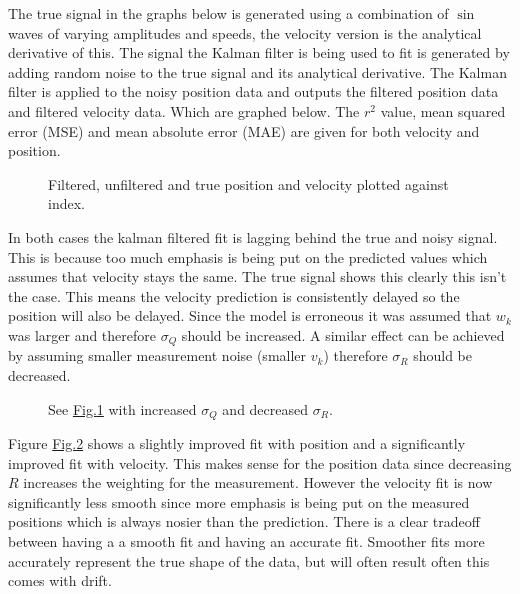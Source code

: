 \documentclass[letterpaper,10pt,english]{jupyterBook}
\begin{document}
\sphinxAtStartPar
The true signal in the graphs below is generated using a combination of \(\sin\) waves of varying amplitudes and speeds, the velocity version is the analytical derivative of this. The signal the Kalman filter is being used to fit is generated by adding random noise to the true signal and its analytical derivative. The Kalman filter is applied to the noisy position data and outputs the filtered position data and filtered velocity data. Which are graphed below.
The \(r^2\) value, mean squared error (MSE) and mean absolute error (MAE) are given for both velocity and position.

\begin{figure}[htbp]
\centering
\capstart

\noindent{}
\caption{Filtered, unfiltered and true position and velocity plotted against index.}\label{\detokenize{4ExampleVelocityFromPosition:fig-original}}\end{figure}

\sphinxAtStartPar
In both cases the kalman filtered fit is lagging behind the true and noisy signal. This is because too much emphasis is being put on the predicted values which assumes that velocity stays the same. The true signal shows this clearly this isn’t the case. This means the velocity prediction is consistently delayed so the position will also be delayed. Since the model is erroneous it was assumed that \(w_k\) was larger and therefore \(\sigma_Q\) should be increased. A similar effect can be achieved by assuming smaller measurement noise (smaller \(v_k\)) therefore \(\sigma_R\) should be decreased.

\begin{figure}[htbp]
\centering
\capstart

\noindent{}
\caption{See \hyperref[\detokenize{4ExampleVelocityFromPosition:fig-original}]{Fig.\@ \ref{\detokenize{4ExampleVelocityFromPosition:fig-original}}} with increased \(\sigma_Q\) and decreased \(\sigma_R\).}\label{\detokenize{4ExampleVelocityFromPosition:fig-increased-r-and-increased-q}}\end{figure}

\sphinxAtStartPar
Figure \hyperref[\detokenize{4ExampleVelocityFromPosition:fig-increased-r-and-increased-q}]{Fig.\@ \ref{\detokenize{4ExampleVelocityFromPosition:fig-increased-r-and-increased-q}}} shows a slightly improved fit with position and a significantly improved fit with velocity. This makes sense for the position data since decreasing \(R\) increases the weighting for the measurement. However the velocity fit is now significantly less smooth since more emphasis is being put on the measured positions which is always nosier than the prediction. There is a clear tradeoff between having a a smooth fit and having an accurate fit. Smoother fits more accurately represent the true shape of the data, but will often result often this comes with drift.
\end{document}
